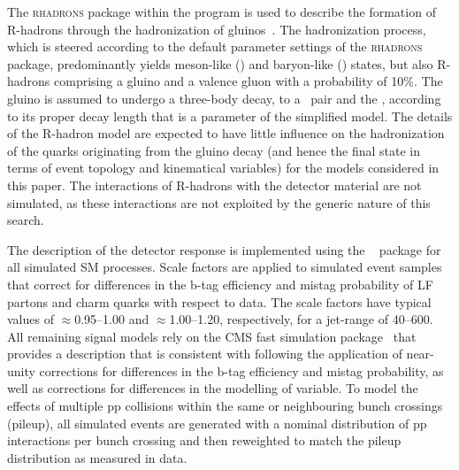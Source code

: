 The \textsc{rhadrons} package within the \PYTHIA program is used to
describe the formation of R-hadrons through the hadronization of
gluinos~\cite{Fairbairn:2006gg, Kraan:2004tz, Mackeprang:2006gx}. The
hadronization process, which is steered according to the default
parameter settings of the \textsc{rhadrons} package, predominantly
yields meson-like (\PSg\Pq\Paq) and baryon-like (\PSg\Pq\Pq\Pq)
states, but also R-hadrons comprising a gluino and a valence gluon
with a probability of 10\%. 
The gluino is assumed to undergo a three-body decay, to a \Pq\Paq\
pair and the \PSGczDo, according to its proper decay length \ctau [mm]
that is a parameter of the simplified model. The details of the
R-hadron model are expected to have little influence on the
hadronization of the quarks originating from the gluino decay (and
hence the final state in terms of event topology and kinematical
variables) for the models considered in this paper. The interactions
of R-hadrons with the detector material are not simulated, as these
interactions are not exploited by the generic nature of this search.

The description of the detector response is implemented using the
\GEANTfour~\cite{geant} package for all simulated SM processes. Scale
factors are applied to simulated event samples that correct for
differences in the b-tag efficiency 
and mistag probability of LF partons and charm quarks 
with respect to data. The scale factors have typical values of
${\approx}$0.95--1.00 and ${\approx}$1.00--1.20, respectively, for a
jet-\pt range of 40--600\GeV. All remaining signal models rely on the
CMS fast simulation package~\cite{fastsim} that provides a description
that is consistent with \GEANTfour following the application of
near-unity corrections %
for differences in the b-tag efficiency and mistag probability,
as well as corrections %
for differences in the modelling of \mht variable. To model the
effects of multiple pp collisions within the same or neighbouring
bunch crossings (pileup), all simulated events are generated with a
nominal distribution of pp interactions per bunch crossing and then
reweighted to match the pileup distribution as measured in data.


